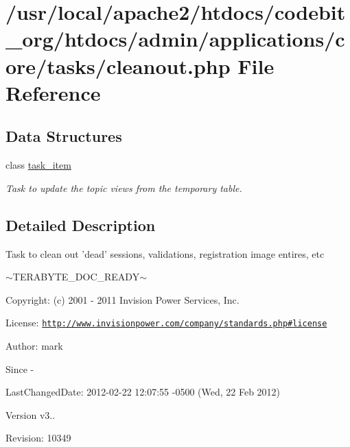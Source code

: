 \hypertarget{cleanout_8php}{\section{/usr/local/apache2/htdocs/codebit\-\_\-org/htdocs/admin/applications/core/tasks/cleanout.php File Reference}
\label{cleanout_8php}
}
\subsection*{Data Structures}
\begin{DoxyCompactItemize}
\item 
class \hyperlink{classtask__item}{task\-\_\-item}
\begin{DoxyCompactList}\small\item\em Task to update the topic views from the temporary table. \end{DoxyCompactList}\end{DoxyCompactItemize}


\subsection{Detailed Description}
\begin{DoxyVerb}  Task to clean out 'dead' sessions, validations, registration image entires, etc
\end{DoxyVerb}
 $\sim$\-T\-E\-R\-A\-B\-Y\-T\-E\-\_\-\-D\-O\-C\-\_\-\-R\-E\-A\-D\-Y$\sim$ \begin{DoxyParagraph}{Copyright\-:}
(c) 2001 -\/ 2011 Invision Power Services, Inc.
\end{DoxyParagraph}
\begin{DoxyParagraph}{License\-:}
\href{http://www.invisionpower.com/company/standards.php#license}{\tt http\-://www.\-invisionpower.\-com/company/standards.\-php\#license}
\end{DoxyParagraph}
\begin{DoxyParagraph}{Author\-:}
mark 
\end{DoxyParagraph}
\begin{DoxySince}{Since}
-\/ 
\end{DoxySince}
\begin{DoxyParagraph}{Last\-Changed\-Date\-:}
2012-\/02-\/22 12\-:07\-:55 -\/0500 (Wed, 22 Feb 2012) 
\end{DoxyParagraph}
\begin{DoxyVersion}{Version}
v3.. 
\end{DoxyVersion}
\begin{DoxyParagraph}{Revision\-:}
10349 
\end{DoxyParagraph}
